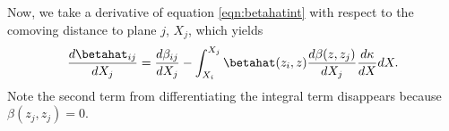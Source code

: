 Now, we take a derivative of equation \ref{eqn:betahatint} with respect to the comoving distance to plane $j$, $X_j$, which yields
\begin{equation}
\frac{d\betahat_{i j}}{d X_j} = \frac{d\beta_{i j}}{d X_j} - \int_{X_i}^{X_j} \betahat(z_i, z) \frac{d \beta(z, z_j)}{d X_j} \frac{d \kappa}{d X} d X.
\end{equation}
Note the second term from differentiating the integral term disappears because $\beta(z_j, z_j) = 0$. 
  
  